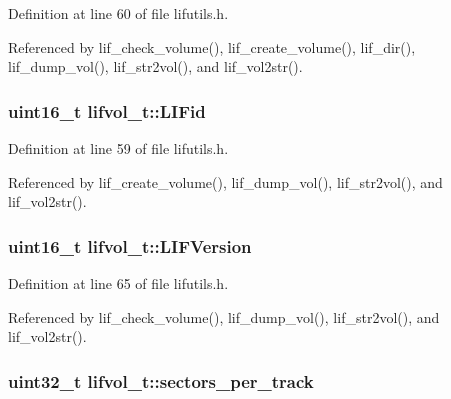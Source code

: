 Definition at line 60 of file lifutils.\+h.



Referenced by lif\+\_\+check\+\_\+volume(), lif\+\_\+create\+\_\+volume(), lif\+\_\+dir(), lif\+\_\+dump\+\_\+vol(), lif\+\_\+str2vol(), and lif\+\_\+vol2str().

\subsubsection[{\texorpdfstring{L\+I\+Fid}{LIFid}}]{\setlength{\rightskip}{0pt plus 5cm}uint16\+\_\+t lifvol\+\_\+t\+::\+L\+I\+Fid}\hypertarget{structlifvol__t_adb6a0c2fff5b765eb12c3eb5db6d5bad}{}\label{structlifvol__t_adb6a0c2fff5b765eb12c3eb5db6d5bad}


Definition at line 59 of file lifutils.\+h.



Referenced by lif\+\_\+create\+\_\+volume(), lif\+\_\+dump\+\_\+vol(), lif\+\_\+str2vol(), and lif\+\_\+vol2str().

\subsubsection[{\texorpdfstring{L\+I\+F\+Version}{LIFVersion}}]{\setlength{\rightskip}{0pt plus 5cm}uint16\+\_\+t lifvol\+\_\+t\+::\+L\+I\+F\+Version}\hypertarget{structlifvol__t_afffd824a7b0ce6aa8410fa243733475f}{}\label{structlifvol__t_afffd824a7b0ce6aa8410fa243733475f}


Definition at line 65 of file lifutils.\+h.



Referenced by lif\+\_\+check\+\_\+volume(), lif\+\_\+dump\+\_\+vol(), lif\+\_\+str2vol(), and lif\+\_\+vol2str().

\subsubsection[{\texorpdfstring{sectors\+\_\+per\+\_\+track}{sectors_per_track}}]{\setlength{\rightskip}{0pt plus 5cm}uint32\+\_\+t lifvol\+\_\+t\+::sectors\+\_\+per\+\_\+track}\hypertarget{structlifvol__t_ad245f7419e180934262f53acd9b4349c}{}\label{structlifvol__t_ad245f7419e180934262f53acd9b4349c}


